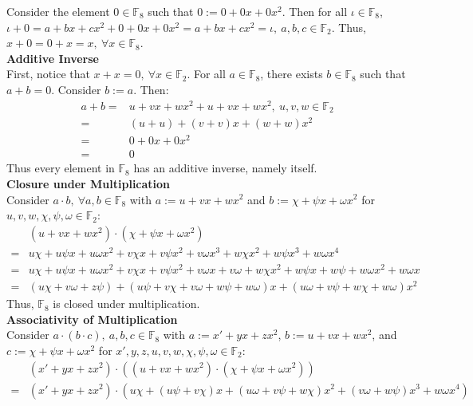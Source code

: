 \documentclass[11pt]{article}
\begin{document}
\begin{flushleft}
Consider the element $0 \in \mathbb{F}_8$ such that $0 := 0 + 0x + 0x^2$. Then for all $\iota \in \mathbb{F}_8$, $\iota + 0 = a + bx + cx^2 + 0 + 0x + 0x^2 = a + bx + cx^2 = \iota, \ a,b,c \in  \mathbb{F}_2$. Thus, $x + 0 = 0 + x = x, \ \forall x \in \mathbb{F}_8$. \\
\bigskip
\textbf{Additive Inverse} \\
First, notice that $x + x = 0, \ \forall x \in \mathbb{F}_2$. For all $a \in \mathbb{F}_8$, there exists $b \in \mathbb{F}_8$ such that $a + b = 0$. Consider $b := a$. Then:
\begin{align*}
a + b = & u + vx + wx^2 + u + vx + wx^2, \ u,v,w \in \mathbb{F}_2 \\
= & (u + u) + (v + v)x + (w + w)x^2 \\
= & 0 + 0x + 0x^2 \\
= & 0
\end{align*}
Thus every element in $\mathbb{F}_8$ has an additive inverse, namely itself.\\
\bigskip
\textbf{Closure under Multiplication} \\
Consider $a \cdot b, \ \forall a,b \in \mathbb{F}_8$ with $a := u + vx + wx^2$ and $b :=\chi + \psi x + \omega x^2$ for $u,v,w, \chi, \psi, \omega \in \mathbb{F}_2$:
\begin{align*}
& (u + vx + wx^2) \cdot (\chi + \psi x + \omega x^2) \\
= & u \chi + u \psi x + u \omega x^2 + v \chi x + v \psi x^2 + v \omega x^3 + w \chi x^2 + w \psi x^3 + w \omega x^4 \\
= & u \chi + u \psi x + u \omega x^2 + v \chi x + v \psi x^2 + v \omega x + v \omega + w \chi x^2 + w \psi x + w \psi  + w \omega x^2 + w \omega x \\
= & (u \chi + v \omega + z \psi) + (u \psi + v \chi + v \omega + w \psi + w \omega )x + (u \omega + v \psi + w \chi + w \omega ) x^2
\end{align*}
Thus, $\mathbb{F}_8$ is closed under multiplication. \\
\bigskip
\textbf{Associativity of Multiplication} \\
Consider $a \cdot (b \cdot c), \ a,b,c \in \mathbb{F}_8$ with $a := x' + yx + zx^2$, $b := u + vx + wx^2$, and $c :=\chi + \psi x + \omega x^2$ for $x',y,z,u,v,w, \chi, \psi, \omega \in \mathbb{F}_2$:
\begin{align*}
& (x' + yx + zx^2) \cdot ((u + vx + wx^2) \cdot (\chi + \psi x + \omega x^2) ) \\
= & (x' + yx + zx^2) \cdot (u \chi + (u \psi + v \chi)x + (u \omega + v \psi + w \chi ) x^2 + (v \omega + w \psi)x^3 + w \omega x^4) \\

\end{align*}
\end{flushleft}
\end{document}
